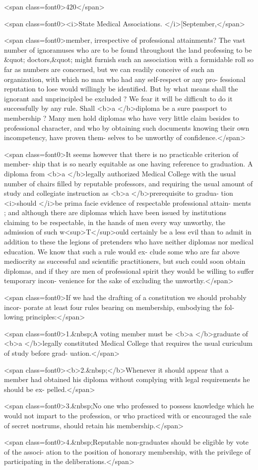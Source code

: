 <span class=font0>420</span>

<span class=font0><i>State Medical Associations. </i>[September,</span>

<span class=font0>member, irrespective of professional attainments? The vast number
of ignoramuses who are to be found throughout the land professing to
be &quot; doctors,&quot; might furnish such an association with a formidable roll
so far as numbers are concerned, but we can readily conceive of such
an organization, with which no man who had any self-respect or any pro-
fessional reputation to lose would willingly be identified. But by what
means shall the ignorant and unprincipled be excluded ? We fear it
will be difficult to do it successfully by any rule. Shall <b>a </b>diploma be
a sure passport to membership ? Many men hold diplomas who have
very little claim besides to professional character, and who by obtaining
such documents knowing their own incompetency, have proven them-
selves to be unworthy of confidence.</span>

<span class=font0>It seems however that there is no practicable criterion of member-
ship that is so nearly equitable as one having reference to graduation.
A diploma from <b>a </b>legally authorized Medical College with the usual
number of chairs filled by reputable professors, and requiring the usual
amount of study and collegiate instruction as <b>a </b>prerequisite to gradua-
tion <i>should </i>be prima facie evidence of respectable professional attain-
ments ; and although there are diplomas which have been issued by
institutions claiming to be respectable, in the hands of men every way
unworthy, the admission of such w<sup>T</sup>ould certainly be a less evil than to
admit in addition to these the legions of pretenders who have neither
diplomas nor medical education. We know that such a rule would ex-
clude some who are far above mediocrity as successful and scientific
practitioners, but such could soon obtain diplomas, and if they are men
of professional spirit they would be willing to suffer temporary incon-
venience for the sake of excluding the unworthy.</span>

<span class=font0>If we had the drafting of a constitution we should probably incor-
porate at least four rules bearing on membership, embodying the fol-
lowing principles:</span>

<span class=font0>1.&nbsp;A voting member must be <b>a </b>graduate of <b>a </b>legally constituted
Medical College that requires the usual curiculum of study before grad-
uation.</span>

<span class=font0><b>2.&nbsp;</b>Whenever it should appear that a member had obtained his
diploma without complying with legal requirements he should be ex-
pelled.</span>

<span class=font0>3.&nbsp;No one who professed to possess knowledge which he would not
impart to the profession, or who practiced with or encouraged the sale of
secret nostrums, should retain his membership.</span>

<span class=font0>4.&nbsp;Reputable non-graduates should be eligible by vote of the associ-
ation to the position of honorary membership, with the privilege of
participating in the deliberations.</span>\endinput
